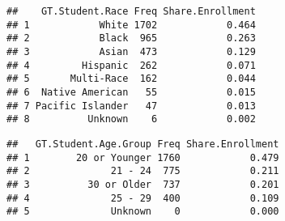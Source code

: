 \documentclass[]{article}
\newenvironment{Shaded}{\begin{snugshade}}{\end{snugshade}}
\newcommand{\KeywordTok}[1]{\textcolor[rgb]{0.13,0.29,0.53}{\textbf{#1}}}
\newcommand{\DataTypeTok}[1]{\textcolor[rgb]{0.13,0.29,0.53}{#1}}
\newcommand{\DecValTok}[1]{\textcolor[rgb]{0.00,0.00,0.81}{#1}}
\newcommand{\StringTok}[1]{\textcolor[rgb]{0.31,0.60,0.02}{#1}}
\newcommand{\OperatorTok}[1]{\textcolor[rgb]{0.81,0.36,0.00}{\textbf{#1}}}
\newcommand{\NormalTok}[1]{#1}
\begin{document}
\begin{verbatim}
##    GT.Student.Race Freq Share.Enrollment
## 1            White 1702            0.464
## 2            Black  965            0.263
## 3            Asian  473            0.129
## 4         Hispanic  262            0.071
## 5       Multi-Race  162            0.044
## 6  Native American   55            0.015
## 7 Pacific Islander   47            0.013
## 8          Unknown    6            0.002
\end{verbatim}

\begin{Shaded}
\end{Shaded}

\begin{verbatim}
##   GT.Student.Age.Group Freq Share.Enrollment
## 1        20 or Younger 1760            0.479
## 2              21 - 24  775            0.211
## 3          30 or Older  737            0.201
## 4              25 - 29  400            0.109
## 5              Unknown    0            0.000
\end{verbatim}
\end{document}
